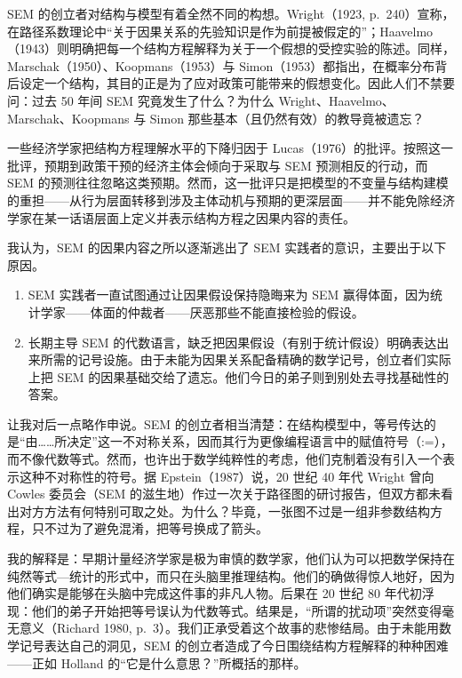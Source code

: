 SEM 的创立者对结构与模型有着全然不同的构想。Wright（1923, p.~240）宣称，在路径系数理论中“关于因果关系的先验知识是作为前提被假定的”；Haavelmo（1943）则明确把每一个结构方程解释为关于一个假想的受控实验的陈述。同样，Marschak（1950）、Koopmans（1953）与 Simon（1953）都指出，在概率分布背后设定一个结构，其目的正是为了应对政策可能带来的假想变化。因此人们不禁要问：过去 50 年间 SEM 究竟发生了什么？为什么 Wright、Haavelmo、Marschak、Koopmans 与 Simon 那些基本（且仍然有效）的教导竟被遗忘？

一些经济学家把结构方程理解水平的下降归因于 Lucas（1976）的批评。按照这一批评，预期到政策干预的经济主体会倾向于采取与 SEM 预测相反的行动，而 SEM 的预测往往忽略这类预期。然而，这一批评只是把模型的不变量与结构建模的重担——从行为层面转移到涉及主体动机与预期的更深层面——并不能免除经济学家在某一话语层面上定义并表示结构方程之因果内容的责任。

我认为，SEM 的因果内容之所以逐渐逃出了 SEM 实践者的意识，主要出于以下原因。

\begin{enumerate}[label=\arabic*.,leftmargin=1.8em]
\item SEM 实践者一直试图通过让因果假设保持隐晦来为 SEM 赢得体面，因为统计学家——体面的仲裁者——厌恶那些不能直接检验的假设。
\item 长期主导 SEM 的代数语言，缺乏把因果假设（有别于统计假设）明确表达出来所需的记号设施。由于未能为因果关系配备精确的数学记号，创立者们实际上把 SEM 的因果基础交给了遗忘。他们今日的弟子则到别处去寻找基础性的答案。
\end{enumerate}

让我对后一点略作申说。SEM 的创立者相当清楚：在结构模型中，等号传达的是“由……所决定”这一不对称关系，因而其行为更像编程语言中的赋值符号（:=），而不像代数等式。然而，也许出于数学纯粹性的考虑，他们克制着没有引入一个表示这种不对称性的符号。据 Epstein（1987）说，20 世纪 40 年代 Wright 曾向 Cowles 委员会（SEM 的滋生地）作过一次关于路径图的研讨报告，但双方都未看出对方方法有何特别可取之处。为什么？毕竟，一张图不过是一组非参数结构方程，只不过为了避免混淆，把等号换成了箭头。

我的解释是：早期计量经济学家是极为审慎的数学家，他们认为可以把数学保持在纯然等式—统计的形式中，而只在头脑里推理结构。他们的确做得惊人地好，因为他们确实是能够在头脑中完成这件事的非凡人物。后果在 20 世纪 80 年代初浮现：他们的弟子开始把等号误认为代数等式。结果是，“所谓的扰动项”突然变得毫无意义（Richard 1980, p.~3）。我们正承受着这个故事的悲惨结局。由于未能用数学记号表达自己的洞见，SEM 的创立者造成了今日围绕结构方程解释的种种困难——正如 Holland 的“它是什么意思？”所概括的那样。

